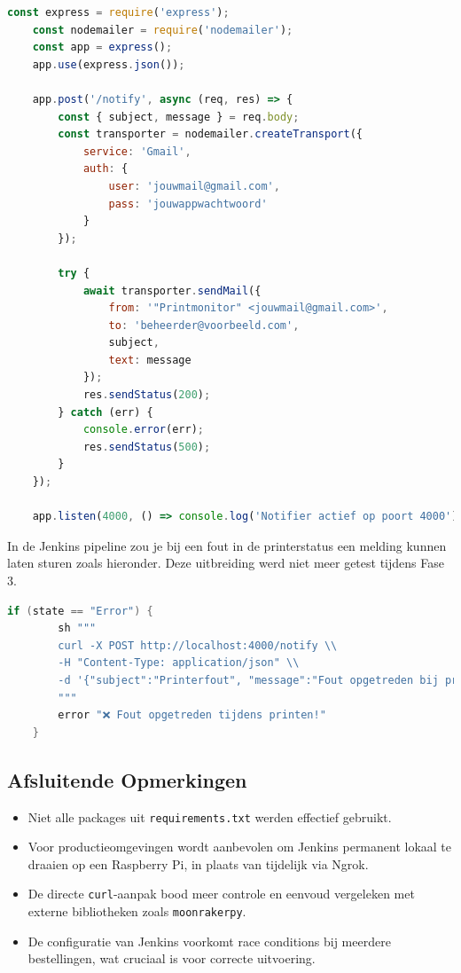 \begin{enumerate}
\begin{lstlisting}[language=javascript, caption=Express-server voor foutnotificatie per e-mail]
    const express = require('express');
    const nodemailer = require('nodemailer');
    const app = express();
    app.use(express.json());
    
    app.post('/notify', async (req, res) => {
        const { subject, message } = req.body;
        const transporter = nodemailer.createTransport({
            service: 'Gmail',
            auth: {
                user: 'jouwmail@gmail.com',
                pass: 'jouwappwachtwoord'
            }
        });
        
        try {
            await transporter.sendMail({
                from: '"Printmonitor" <jouwmail@gmail.com>',
                to: 'beheerder@voorbeeld.com',
                subject,
                text: message
            });
            res.sendStatus(200);
        } catch (err) {
            console.error(err);
            res.sendStatus(500);
        }
    });
    
    app.listen(4000, () => console.log('Notifier actief op poort 4000'));
\end{lstlisting}

In de Jenkins pipeline zou je bij een fout in de printerstatus een melding kunnen laten sturen zoals hieronder. Deze uitbreiding werd niet meer getest tijdens Fase 3.

\begin{lstlisting}[language=groovy]
    if (state == "Error") {
        sh """
        curl -X POST http://localhost:4000/notify \\
        -H "Content-Type: application/json" \\
        -d '{"subject":"Printerfout", "message":"Fout opgetreden bij printen van ${bestandNaam}."}'
        """
        error "❌ Fout opgetreden tijdens printen!"
    }
\end{lstlisting}

\subsection{Afsluitende Opmerkingen}
\begin{itemize}
    \item Niet alle packages uit \texttt{requirements.txt} werden effectief gebruikt.
    \item Voor productieomgevingen wordt aanbevolen om Jenkins permanent lokaal te draaien op een Raspberry Pi, in plaats van tijdelijk via Ngrok.
    \item De directe \texttt{curl}-aanpak bood meer controle en eenvoud vergeleken met externe bibliotheken zoals \texttt{moonrakerpy}.
    \item De configuratie van Jenkins voorkomt race conditions bij meerdere bestellingen, wat cruciaal is voor correcte uitvoering.
\end{itemize}


\end{enumerate}
